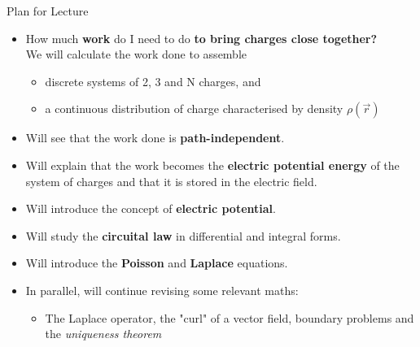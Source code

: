 \begin{frame}{Plan for Lecture \thislecture}

\begin{itemize}
  \item How much {\bf work} do I need to do {\bf to bring charges close together?}\\
    \vspace{0.2cm}
    We will calculate the work done to assemble
    \begin{itemize}
       \item discrete systems of 2, 3 and N charges, and
       \item a continuous distribution of charge characterised by density $\rho(\vec{r})$
    \end{itemize}
  \vspace{0.1cm}
  \item Will see that the work done is {\bf path-independent}.
  \vspace{0.1cm}
  \item Will explain that the work becomes the {\bf electric potential energy}
        of the system of charges and that it is stored in the electric field.
  \item Will introduce the concept of {\bf electric potential}.
  \vspace{0.1cm}
  \item Will study the {\bf circuital law} in differential and integral forms.
  \vspace{0.1cm}
  \item Will introduce the {\bf Poisson} and {\bf Laplace} equations.
  \vspace{0.1cm}
  \item In parallel, will continue revising some relevant maths:
    \begin{itemize}
      \item The Laplace operator, the "curl" of a vector field,
            boundary problems and the {\em uniqueness theorem}
    \end{itemize}
\end{itemize}
\end{frame}


%
%
%


